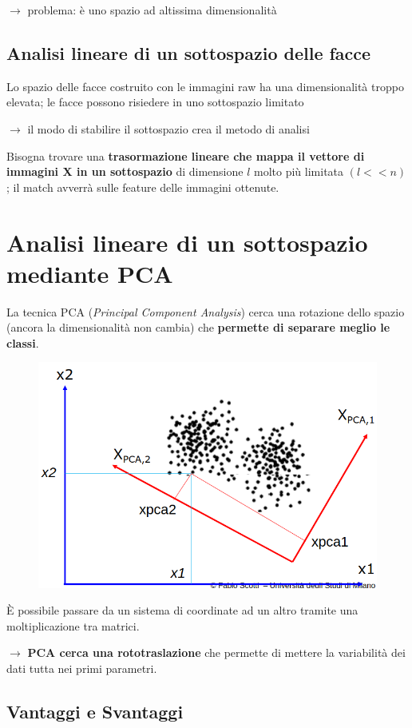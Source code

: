 \documentclass{report}
\begin{document}
$\rightarrow$ problema: è uno spazio ad altissima dimensionalità

\subsection{Analisi lineare di un sottospazio delle facce}
Lo spazio delle facce costruito con le immagini raw ha una dimensionalità
troppo elevata; le facce possono risiedere in uno sottospazio limitato 

$\rightarrow$ il modo di stabilire il sottospazio crea il metodo di analisi

\noindent Bisogna trovare una \textbf{trasormazione lineare che mappa il vettore
di immagini X in un sottospazio} di dimensione $l$ molto più 
limitata $(l << n)$; il match avverrà sulle feature delle immagini ottenute.

\section{Analisi lineare di un sottospazio mediante PCA}

La tecnica PCA (\textit{Principal Component Analysis}) cerca una rotazione 
dello spazio (ancora la dimensionalità non cambia) che \textbf{permette di 
separare meglio le classi}.

\begin{figure}[ht]
    \centering
    \includegraphics[width=0.7\linewidth]{images/pca.png}
\end{figure}

\noindent È possibile passare da un sistema di coordinate ad un altro tramite una moltiplicazione
tra matrici.

$\rightarrow$ \textbf{PCA cerca una rototraslazione} che permette di 
mettere la variabilità dei dati tutta nei primi parametri.

\subsection{Vantaggi e Svantaggi}
\end{document}
